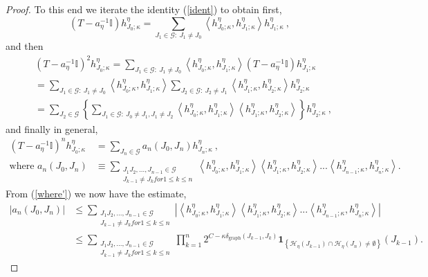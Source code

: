 \documentclass[10pt,a4paper]{amsart}
\begin{document}
\begin{proof}
To this end we iterate the identity (\ref{ident}) to obtain first,%
\[
\left(  T-a_{\eta}^{-1}\mathbb{I}\right)  h_{J_{0};\kappa}^{\eta}=\sum
_{J_{1}\in\mathcal{G}:\ J_{1}\neq J_{0}}\left\langle h_{J_{0};\kappa}^{\eta
},h_{J_{1};\kappa}^{\eta}\right\rangle h_{J_{1};\kappa}^{\eta}\ ,
\]
and then%
\begin{align*}
& \left(  T-a_{\eta}^{-1}\mathbb{I}\right)  ^{2}h_{J_{0};\kappa}^{\eta}%
=\sum_{J_{1}\in\mathcal{G}:\ J_{1}\neq J_{0}}\left\langle h_{J_{0};\kappa
}^{\eta},h_{J_{1};\kappa}^{\eta}\right\rangle \left(  T-a_{\eta}%
^{-1}\mathbb{I}\right)  h_{J_{1};\kappa}^{\eta}\\
& =\sum_{J_{1}\in\mathcal{G}:\ J_{1}\neq J_{0}}\left\langle h_{J_{0};\kappa
}^{\eta},h_{J_{1};\kappa}^{\eta}\right\rangle \sum_{J_{2}\in\mathcal{G}%
:\ J_{2}\neq J_{1}}\left\langle h_{J_{1};\kappa}^{\eta},h_{J_{2};\kappa}%
^{\eta}\right\rangle h_{J_{2};\kappa}^{\eta}\\
& =\sum_{J_{2}\in\mathcal{G}}\left\{  \sum_{J_{1}\in\mathcal{G}:\ J_{0}\neq
J_{1},J_{1}\neq J_{2}}\left\langle h_{J_{0};\kappa}^{\eta},h_{J_{1};\kappa
}^{\eta}\right\rangle \left\langle h_{J_{1};\kappa}^{\eta},h_{J_{2};\kappa
}^{\eta}\right\rangle \right\}  h_{J_{2};\kappa}^{\eta}\ ,
\end{align*}
and finally in general,%
\begin{align*}
\left(  T-a_{\eta}^{-1}\mathbb{I}\right)  ^{n}h_{J_{0};\kappa}^{\eta}  &
=\sum_{J_{n}\in\mathcal{G}}a_{n}\left(  J_{0},J_{n}\right)  h_{J_{n};\kappa
}^{\eta}\ ,\\
\text{where }a_{n}\left(  J_{0},J_{n}\right)    & \equiv\sum_{\substack{J_{1}%
J_{2},...,J_{n-1}\in\mathcal{G}\\J_{k-1}\neq J_{k}for1\leq k\leq
n}}\left\langle h_{J_{0};\kappa}^{\eta},h_{J_{1};\kappa}^{\eta}\right\rangle
\left\langle h_{J_{1};\kappa}^{\eta},h_{J_{2};\kappa}^{\eta}\right\rangle
...\left\langle h_{J_{n-1};\kappa}^{\eta},h_{J_{n};\kappa}^{\eta}\right\rangle
.
\end{align*}
From (\ref{where'}) we now have the estimate,%
\begin{align}
\left\vert a_{n}\left(  J_{0},J_{n}\right)  \right\vert  & \leq\sum
_{\substack{J_{1}J_{2},...,J_{n-1}\in\mathcal{G}\\J_{k-1}\neq J_{k}for1\leq
k\leq n}}\left\vert \left\langle h_{J_{0};\kappa}^{\eta},h_{J_{1};\kappa
}^{\eta}\right\rangle \left\langle h_{J_{1};\kappa}^{\eta},h_{J_{2};\kappa
}^{\eta}\right\rangle ...\left\langle h_{J_{n-1};\kappa}^{\eta},h_{J_{n}%
;\kappa}^{\eta}\right\rangle \right\vert \label{from where'}\\
& \leq\sum_{\substack{J_{1}J_{2},...,J_{n-1}\in\mathcal{G}\\J_{k-1}\neq
J_{k}for1\leq k\leq n}}\prod_{k=1}^{n}2^{C-\kappa\delta_{\operatorname*{graph}%
}\left(  J_{k-1},J_{k}\right)  }\mathbf{1}_{\left\{  \mathcal{H}_{\eta}\left(
J_{k-1}\right)  \cap\mathcal{H}_{\eta}\left(  J_{n}\right)  \neq
\emptyset\right\}  }\left(  J_{k-1}\right)  .\nonumber
\end{align}



\end{proof}
\end{document}
